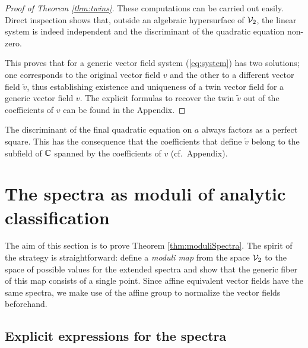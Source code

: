 \documentclass[phd,tocprelim]{cornell}
\begin{document}
\begin{proof}[Proof of Theorem \ref*{thm:twins}]
These computations can be carried out easily. Direct inspection shows that, outside an algebraic hypersurface of $\mathcal{V}_2$, the linear system is indeed independent and the discriminant of the quadratic equation non-zero. 


This proves that for a generic vector field system (\ref{eq:system}) has two solutions; one corresponds to the original vector field $v$ and the other to a different vector field $\tilde{v}$, thus establishing existence and uniqueness of a twin vector field for a generic vector field $v$. The explicit formulas to recover the twin $\tilde{v}$ out of the coefficients of $v$ can be found in the Appendix. %
\end{proof}

\begin{remark}
 The discriminant of the final quadratic equation on $a$ always factors as a perfect square. This has the consequence that the coefficients that define $\tilde{v}$ belong to the subfield of $\mathbb{C}$ spanned by the coefficients of $v$ (cf.~Appendix). %
\end{remark}




\section{The spectra as moduli of analytic classification}

The aim of this section is to prove Theorem \ref{thm:moduliSpectra}. The spirit of the strategy is straightforward: define a \textit{moduli map} from the space $\mathcal{V}_2$ to the space of possible values for the extended spectra and show that the generic fiber of this map consists of a single point. Since affine equivalent vector fields have the same spectra, we make use of the affine group to normalize the vector fields beforehand.


\subsection{Explicit expressions for the spectra}
\end{document}
